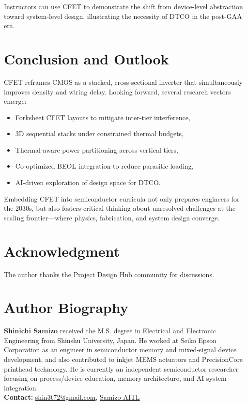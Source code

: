 \documentclass[conference]{IEEEtran}
\begin{document}
Instructors can use CFET to demonstrate the shift from device-level
abstraction toward system-level design, illustrating the necessity of
DTCO in the post-GAA era.

\section{Conclusion and Outlook}
CFET reframes CMOS as a stacked, cross-sectional inverter that
simultaneously improves density and wiring delay. Looking forward,
several research vectors emerge:
\begin{itemize}
  \item Forksheet CFET layouts to mitigate inter-tier interference,
  \item 3D sequential stacks under constrained thermal budgets,
  \item Thermal-aware power partitioning across vertical tiers,
  \item Co-optimized BEOL integration to reduce parasitic loading,
  \item AI-driven exploration of design space for DTCO.
\end{itemize}

Embedding CFET into semiconductor curricula not only prepares
engineers for the 2030s, but also fosters critical thinking about
unresolved challenges at the scaling frontier—where physics,
fabrication, and system design converge.

\section*{Acknowledgment}
The author thanks the Project Design Hub community for discussions.




\section*{Author Biography}
\noindent\textbf{Shinichi Samizo}
received the M.S. degree in Electrical and Electronic Engineering from Shinshu University, Japan.
He worked at Seiko Epson Corporation as an engineer in semiconductor memory and mixed-signal device development, and also contributed to inkjet MEMS actuators and PrecisionCore printhead technology.
He is currently an independent semiconductor researcher focusing on process/device education, memory architecture, and AI system integration.\\[2pt]
\textbf{Contact:} \href{mailto:shin3t72@gmail.com}{shin3t72@gmail.com}, \href{https://github.com/Samizo-AITL}{Samizo-AITL}
\end{document}
